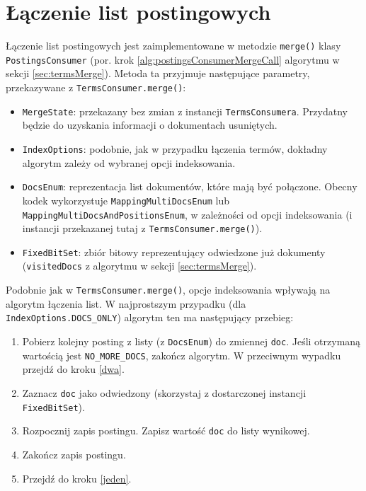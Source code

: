 \section{Łączenie list postingowych}

Łączenie list postingowych jest zaimplementowane w metodzie \texttt{merge()} klasy \texttt{PostingsConsumer} (por. krok \ref{alg:postingsConsumerMergeCall} algorytmu w sekcji \ref{sec:termsMerge}). Metoda ta przyjmuje następujące parametry, przekazywane z \texttt{TermsConsumer.merge()}:
\begin{itemize}
 \item \texttt{MergeState}: przekazany bez zmian z instancji \texttt{TermsConsumera}. Przydatny będzie do uzyskania informacji o dokumentach usuniętych.
 \item \texttt{IndexOptions}: podobnie, jak w przypadku łączenia termów, dokładny algorytm zależy od wybranej opcji indeksowania.
 \item \texttt{DocsEnum}: reprezentacja list dokumentów, które mają być połączone. Obecny kodek wykorzystuje \texttt{MappingMultiDocsEnum} lub \\ \texttt{MappingMultiDocsAndPositionsEnum}, w zależności od opcji indeksowania (i instancji przekazanej tutaj z \texttt{TermsConsumer.merge()}). 
 \item \texttt{FixedBitSet}: zbiór bitowy reprezentujący odwiedzone już dokumenty (\texttt{visitedDocs} z algorytmu w sekcji \ref{sec:termsMerge}).
\end{itemize}

Podobnie jak w \texttt{TermsConsumer.merge()}, opcje indeksowania wpływają na algorytm łączenia list. W najprostszym przypadku (dla \texttt{IndexOptions.DOCS\_ONLY}) algorytm ten ma następujący przebieg:
\begin{enumerate}
 \item \label{jeden} Pobierz kolejny posting z listy (z \texttt{DocsEnum}) do zmiennej \texttt{doc}. Jeśli otrzymaną wartością jest \texttt{NO\_MORE\_DOCS}, zakończ algorytm. W przeciwnym wypadku przejdź do kroku \ref{dwa}.
 \item \label{dwa} Zaznacz \texttt{doc} jako odwiedzony (skorzystaj z dostarczonej instancji \texttt{FixedBitSet}).
 \item \label{trzy} Rozpocznij zapis postingu. Zapisz wartość \texttt{doc} do listy wynikowej.
 \item Zakończ zapis postingu.
 \item Przejdź do kroku \ref{jeden}.
\end{enumerate}

